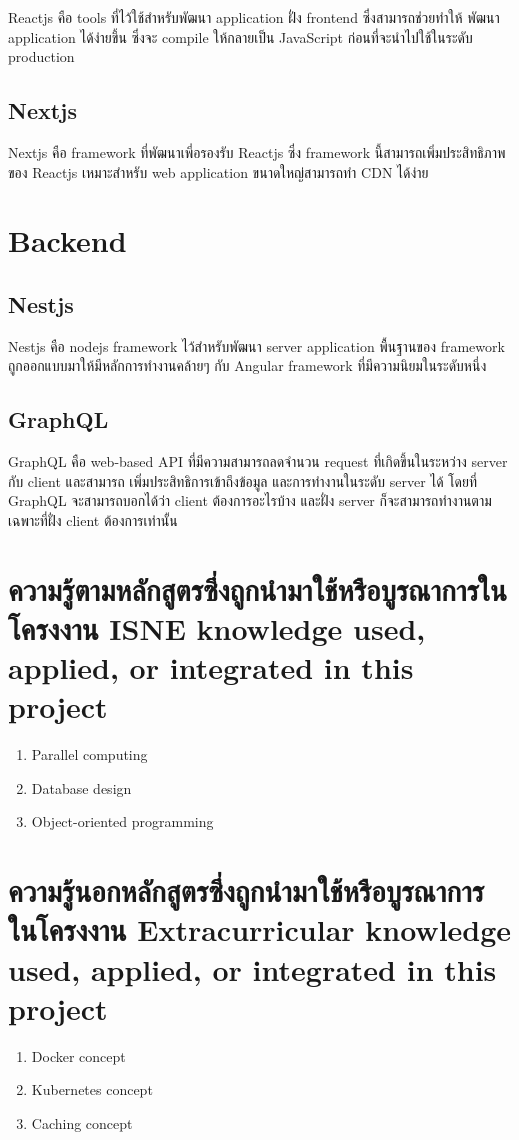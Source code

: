 Reactjs \cite{reactjs} คือ tools ที่ไว้ใช้สำหรับพัฒนา application ฝั่ง frontend ซึ่งสามารถช่วยทำให้ พัฒนา application ได้ง่ายขึ้น ซึ่งจะ compile ให้กลายเป็น JavaScript ก่อนที่จะนำไปใช้ในระดับ production

\subsection{Nextjs}

Nextjs \cite{nextjs} คือ framework ที่พัฒนาเพี่อรองรับ Reactjs ซึ่ง framework นี้สามารถเพิ่มประสิทธิภาพของ Reactjs เหมาะสำหรับ web application ขนาดใหญ่สามารถทำ CDN \cite{cdn} ได้ง่าย

\section{Backend}

\subsection{Nestjs}

Nestjs \cite{nestjs} คือ nodejs framework ไว้สำหรับพัฒนา server application \cite {serverapplication} พื้นฐานของ framework ถูกออกแบบมาให้มีหลักการทำงานคล้ายๆ กับ Angular framework \cite{angular} ที่มีความนิยมในระดับหนึ่ง

\subsection{GraphQL}

GraphQL \cite{graphql} คือ web-based API \cite{webapi} ที่มีความสามารถลดจำนวน request ที่เกิดขึ้นในระหว่าง server กับ client และสามารถ เพิ่มประสิทธิการเข้าถึงข้อมูล และการทำงานในระดับ server ได้ โดยที่ GraphQL จะสามารถบอกได้ว่า client ต้องการอะไรบ้าง และฝั่ง server ก็จะสามารถทำงานตามเฉพาะที่ฝั่ง client ต้องการเท่านั้น

\section{\ifcpe%
ความรู้ตามหลักสูตรซึ่งถูกนำมาใช้หรือบูรณาการในโครงงาน
\else%
ISNE knowledge used, applied, or integrated in this project
\fi
}

\begin{enumerate}
    \item Parallel computing
    \item Database design
    \item Object-oriented programming
\end{enumerate}

\section{\ifcpe%
ความรู้นอกหลักสูตรซึ่งถูกนำมาใช้หรือบูรณาการในโครงงาน
\else%
Extracurricular knowledge used, applied, or integrated in this project
\fi
}

\begin{enumerate}
    \item Docker concept
    \item Kubernetes concept
    \item Caching concept
\end{enumerate}
